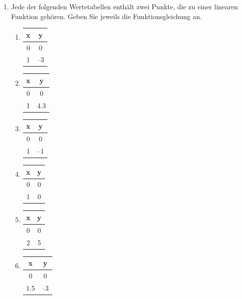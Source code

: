 \documentclass[%
11pt,%
twoside,%
titlepage,%
german,%
headsepline%
]{scrartcl}
\begin{document}
{{\begin{enumerate}
\item Jede der folgenden Wertetabellen enth\"alt zwei Punkte, die zu einer linearen Funktion geh\"oren. Geben Sie jeweils die Funktionsgleichung an.
  \begin{enumerate}
  \item 
    \begin{tabular}{|c|c|} 
      \hline 
      x & y \\ \hline\hline
      0 & 0 \\ \hline
      1 & --3 \\ \hline
    \end{tabular}
  \item 
    \begin{tabular}{|c|c|} 
      \hline 
      x & y \\ \hline\hline
      0 & 0 \\ \hline
      1 & 4.3 \\ \hline
    \end{tabular}
  \item 
    \begin{tabular}{|c|c|} 
      \hline 
      x & y \\ \hline\hline
      0 & 0 \\ \hline
      1 & --1 \\ \hline
    \end{tabular}
  \item 
    \begin{tabular}{|c|c|} 
      \hline 
      x & y \\ \hline\hline
      0 & 0 \\ \hline
      1 & 0 \\ \hline
    \end{tabular}
  \item 
    \begin{tabular}{|c|c|} 
      \hline 
      x & y \\ \hline\hline
      0 & 0 \\ \hline
      2 & 5 \\ \hline
    \end{tabular}
  \item 
    \begin{tabular}{|c|c|} 
      \hline 
      x & y \\ \hline\hline
      0 & 0 \\ \hline
      1.5 & --3 \\ \hline
    \end{tabular}
  \end{enumerate}


\end{enumerate}}}
\end{document}
